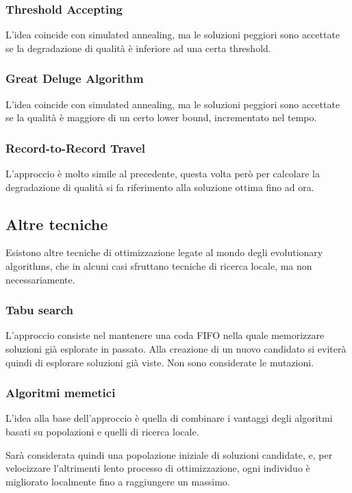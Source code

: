 \documentclass[a4paper]{article}
\begin{document}
\subsubsection{Threshold Accepting}
L'idea coincide con simulated annealing, ma le soluzioni peggiori sono accettate 
se la degradazione di qualità è inferiore ad una certa threshold.

\subsubsection{Great Deluge Algorithm}
L'idea coincide con simulated annealing, ma le soluzioni peggiori sono accettate 
se la qualità è maggiore di un certo lower bound, incrementato nel tempo.

\subsubsection{Record-to-Record Travel}
L'approccio è molto simile al precedente, questa volta però per calcolare la degradazione 
di qualità si fa riferimento alla soluzione ottima fino ad ora.

\subsection{Altre tecniche}
Esistono altre tecniche di ottimizzazione legate al mondo degli 
evolutionary algorithms, che in alcuni casi sfruttano tecniche di ricerca locale, 
ma non necessariamente.

\subsubsection{Tabu search}
L'approccio consiste nel mantenere una coda FIFO nella quale memorizzare 
soluzioni già esplorate in passato.
Alla creazione di un nuovo candidato si eviterà quindi di esplorare soluzioni già viste.
Non sono considerate le mutazioni.

\subsubsection{Algoritmi memetici}
L'idea alla base dell'approccio è quella di combinare i vantaggi degli algoritmi 
basati su popolazioni e quelli di ricerca locale.

Sarà considerata quindi una popolazione iniziale di soluzioni candidate, e, per
velocizzare l'altrimenti lento processo di ottimizzazione, ogni individuo è migliorato 
localmente fino a raggiungere un massimo.
\end{document}
